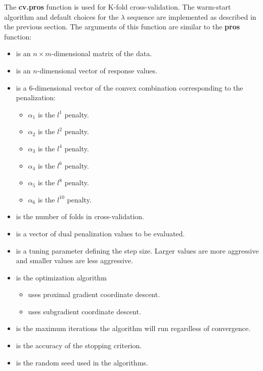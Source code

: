\documentclass[article]{jss}
\numberwithin{equation}{section}
\begin{document}
The \textbf{cv.pros} function is used for K-fold cross-validation.
The warm-start algorithm and default choices for the $\lambda$ sequence are implemented as described in the previous section.
The arguments of this function are similar to the \textbf{pros} function:

\begin{itemize}
\item {} is an $n \times m$-dimensional matrix of the data.

\item {} is an $n$-dimensional vector of response values.

\item {} is a $6$-dimensional vector of the convex combination corresponding to the penalization:
 \begin{itemize}
   \item $\alpha_1$ is the $l^1$ penalty.
   \item $\alpha_2$ is the $l^2$ penalty.
   \item $\alpha_3$ is the $l^4$ penalty.
   \item $\alpha_4$ is the $l^6$ penalty.
   \item $\alpha_5$ is the $l^8$ penalty.
   \item $\alpha_6$ is the $l^{10}$ penalty.
\end{itemize}

\item {} is the number of folds in cross-validation.

\item {} is a vector of dual penalization values to be evaluated.

\item {} is a tuning parameter defining the step size. Larger values are more aggressive and smaller values are less aggressive.

\item {} is the optimization algorithm
\begin{itemize}
\item {} uses proximal gradient coordinate descent.
\item {} uses subgradient coordinate descent.
\end{itemize}

\item {} is the maximum iterations the algorithm will run regardless of convergence.

\item {} is the accuracy of the stopping criterion.

\item {} is the random seed used in the algorithms.

\end{itemize}
\end{document}
